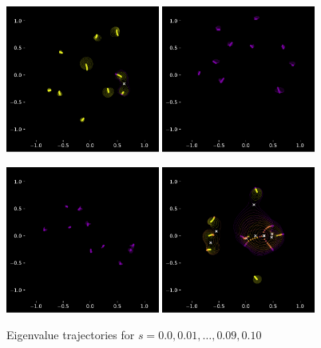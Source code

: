\documentclass{article}
\begin{document}
	\begin{figure}[htbp]
		\centering
		\includegraphics[width=0.45\textwidth]{figures/N10Circle00to01.pdf}
		\includegraphics[width=0.45\textwidth]{figures/N10Meander00to01.pdf}

		\includegraphics[width=0.45\textwidth]{figures/N10Crossing00to01.pdf}
		\includegraphics[width=0.45\textwidth]{figures/N10Circle00to01B.pdf}

		\caption{Eigenvalue trajectories for $s= 0.0, 0.01, \dots , 0.09, 0.10$ }
		\label{fig:pdf_image}
	\end{figure}
\end{document}
